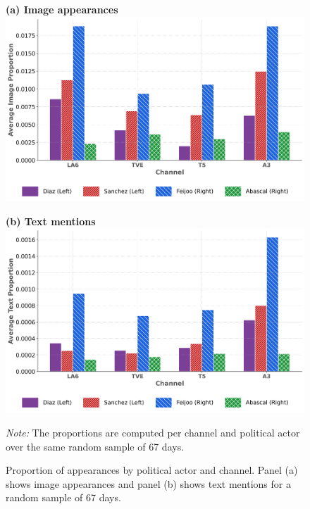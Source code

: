 \documentclass[12pt]{article}
\begin{document}
\begin{figure}[htbp!]
	\centering
	\caption{Proportion of appearances by political actor and channel. Panel (a) shows image appearances and panel (b) shows text mentions for a random sample of 67 days.}
	
	\begin{minipage}{0.48\textwidth}
		\centering
		\textbf{(a) Image appearances}\\[1ex]
		\includegraphics[width=\linewidth]{figures/politicians_image_proportions}
	\end{minipage}%
	\hfill
	\begin{minipage}{0.48\textwidth}
		\centering
		\textbf{(b) Text mentions}\\[1ex]
		\includegraphics[width=\linewidth]{figures/politicians_text_proportions}
	\end{minipage}
	
	\vspace{1ex}
	
	{\small
		\textit{Note:} The proportions are computed per channel and political actor over the same random sample of 67 days.}
	\label{fig:combined_channel}
\end{figure}
\end{document}
